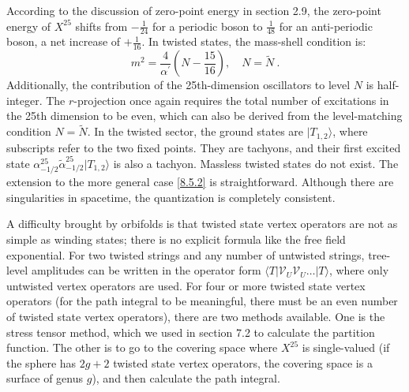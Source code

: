 According to the discussion of zero-point energy in section 2.9, the zero-point energy of $X^{25}$ shifts from $-\frac{1}{24}$ for a periodic boson to $\frac{1}{48}$ for an anti-periodic boson, a net increase of $+\frac{1}{16}$. 
In twisted states, the mass-shell condition is:
\begin{equation}
	m^{2}=\frac{4}{\alpha^{\prime}}\left(N-\frac{15}{16}\right), \quad N=\tilde{N} \:. \label{8.5.8}
\end{equation}
Additionally, the contribution of the 25th-dimension oscillators to level $N$ is half-integer. The $r$-projection once again requires the total number of excitations in the 25th dimension to be even, which can also be derived from the level-matching condition $N=\tilde{N}$. 
In the twisted sector, the ground states are $|T_{1,2}\rangle$, where subscripts refer to the two fixed points. 
They are tachyons, 
and their first excited state $\alpha_{-1/2}^{25} \tilde{\alpha}_{-1/2}^{25}|T_{1,2}\rangle$ is also a tachyon. Massless twisted states do not exist. 
The extension to the more general case \eqref{8.5.2} is straightforward. Although there are singularities in spacetime, the quantization is completely consistent.

A difficulty brought by orbifolds is that twisted state vertex operators are not as simple as winding states; there is no explicit formula like the free field exponential. For two twisted strings and any number of untwisted strings, 
tree-level amplitudes can be written in the operator form $\langle T|\mathscr{V}_{U} \mathscr{V}_{U} \ldots|T\rangle$, where only untwisted vertex operators are used. 
For four or more twisted state vertex operators (for the path integral to be meaningful, there must be an even number of twisted state vertex operators), there are two methods available. 
One is the stress tensor method, which we used in section 7.2 to calculate the partition function. The other is to go to the covering space where $X^{25}$ is single-valued (if the sphere has $2g+2$ twisted state vertex operators, the covering space is a surface of genus $g$), and then calculate the path integral.

